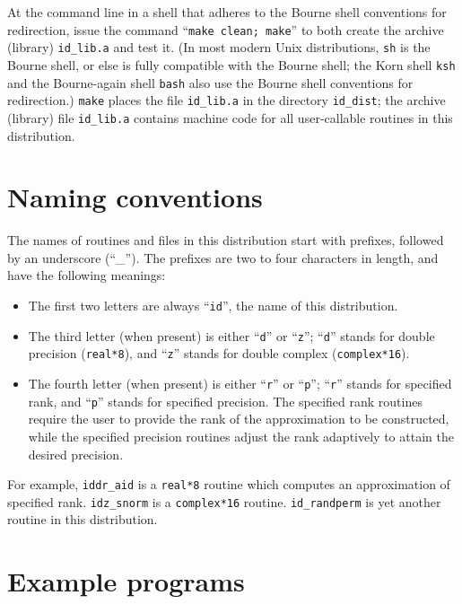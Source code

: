 \documentclass[letterpaper,12pt]{article}
\begin{document}
At the command line in a shell that adheres
to the Bourne shell conventions for redirection, issue the command
``{\tt make clean; make}'' to both create the archive (library)
{\tt id\_lib.a} and test it.
(In most modern Unix distributions, {\tt sh} is the Bourne shell,
or else is fully compatible with the Bourne shell;
the Korn shell {\tt ksh} and the Bourne-again shell {\tt bash}
also use the Bourne shell conventions for redirection.)
{\tt make} places the file {\tt id\_lib.a}
in the directory {\tt id\_dist}; the archive (library) file
{\tt id\_lib.a} contains machine code for all user-callable routines
in this distribution.



\section{Naming conventions}
\label{naming}

The names of routines and files in this distribution
start with prefixes, followed by an underscore (``\_'').
The prefixes are two to four characters in length,
and have the following meanings:
%
\begin{itemize}
\item The first two letters are always ``{\tt id}'',
      the name of this distribution.
\item The third letter (when present) is either ``{\tt d}''
      or ``{\tt z}'';
      ``{\tt d}'' stands for double precision ({\tt real*8}),
      and ``{\tt z}'' stands for double complex ({\tt complex*16}).
\item The fourth letter (when present) is either ``{\tt r}''
      or ``{\tt p}'';
      ``{\tt r}'' stands for specified rank,
      and ``{\tt p}'' stands for specified precision.
      The specified rank routines require the user to provide
      the rank of the approximation to be constructed,
      while the specified precision routines adjust the rank adaptively
      to attain the desired precision.
\end{itemize}

For example, {\tt iddr\_aid} is a {\tt real*8} routine which computes
an approximation of specified rank.
{\tt idz\_snorm} is a {\tt complex*16} routine.
{\tt id\_randperm} is yet another routine in this distribution.



\section{Example programs}
\end{document}
